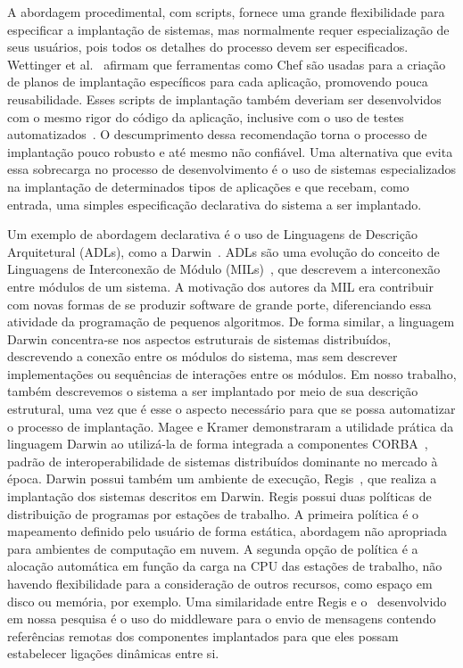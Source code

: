 A abordagem procedimental, com scripts, fornece uma grande 
flexibilidade para especificar a implantação de sistemas, 
mas normalmente requer especialização de seus usuários, 
pois todos os detalhes do processo devem ser especificados. 
Wettinger et al.~\cite{Wettinger2013ExtensiblePaaS} 
afirmam que ferramentas como Chef são usadas
para a criação de planos de implantação específicos para cada aplicação,
promovendo pouca reusabilidade.
Esses scripts de implantação também deveriam ser desenvolvidos 
com o mesmo rigor do código da aplicação, inclusive com o uso 
de testes automatizados~\cite{Humble2011Continuous}. 
O descumprimento dessa recomendação torna o processo de implantação 
pouco robusto e até mesmo não confiável. Uma alternativa que evita 
essa sobrecarga no processo de desenvolvimento é o uso de sistemas 
especializados na implantação de determinados tipos de aplicações e que recebam, 
como entrada, uma simples especificação declarativa do sistema a ser implantado.

Um exemplo de abordagem declarativa é o uso de Linguagens de Descrição Arquitetural (ADLs), como a Darwin~\cite{Magee1996Dynamic}. ADLs são uma evolução do conceito de Linguagens de Interconexão de Módulo (MILs)~\cite{DeRemer1976Programming}, que descrevem a interconexão entre módulos de um sistema. A motivação dos autores da MIL era contribuir com novas formas de se produzir software de grande porte, diferenciando essa atividade da programação de pequenos algoritmos. De forma similar, a linguagem Darwin concentra-se nos aspectos estruturais de sistemas distribuídos, descrevendo a conexão entre os módulos do sistema, mas sem descrever implementações ou sequências de interações entre os módulos. Em nosso trabalho, também descrevemos o sistema a ser implantado por meio de sua descrição estrutural, uma vez que é esse o aspecto necessário para que se possa automatizar o processo de implantação. Magee e Kramer demonstraram a utilidade prática da linguagem Darwin ao utilizá-la de forma integrada a componentes CORBA~\cite{Magee1997Corba}, padrão de interoperabilidade de sistemas distribuídos dominante no mercado à época. Darwin possui também um ambiente de execução, Regis~\cite{Magee1994Regis}, que realiza a implantação dos sistemas descritos em Darwin. Regis possui duas políticas de distribuição de programas por estações de trabalho. A primeira política é o mapeamento definido pelo usuário de forma estática, abordagem não apropriada para ambientes de computação em nuvem. A segunda opção de política é a alocação automática em função da carga na CPU das estações de trabalho, não havendo flexibilidade para a consideração de outros recursos, como espaço em disco ou memória, por exemplo. Uma similaridade entre Regis e o \ee\ desenvolvido em nossa pesquisa é o uso do middleware para o envio de mensagens contendo referências remotas dos componentes implantados para que eles possam estabelecer ligações dinâmicas entre si.


